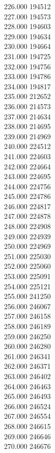{ 226.000	194512 \\
 227.000	194573 \\
 228.000	194603 \\
 229.000	194634 \\
 230.000	194664 \\
 231.000	194725 \\
 232.000	194756 \\
 233.000	194786 \\
 234.000	194817 \\
 235.000	212652 \\
 236.000	214573 \\
 237.000	214634 \\
 238.000	214695 \\
 239.000	214969 \\
 240.000	224512 \\
 241.000	224603 \\
 242.000	224664 \\
 243.000	224695 \\
 244.000	224756 \\
 245.000	224786 \\
 246.000	224817 \\
 247.000	224878 \\
 248.000	224908 \\
 249.000	224939 \\
 250.000	224969 \\
 251.000	225030 \\
 252.000	225060 \\
 253.000	225091 \\
 254.000	225121 \\
 255.000	241250 \\
 256.000	246067 \\
 257.000	246158 \\
 258.000	246189 \\
 259.000	246250 \\
 260.000	246280 \\
 261.000	246341 \\
 262.000	246371 \\
 263.000	246402 \\
 264.000	246463 \\
 265.000	246493 \\
 266.000	246524 \\
 267.000	246554 \\
 268.000	246615 \\
 269.000	246646 \\
 270.000	246676 \\
}
